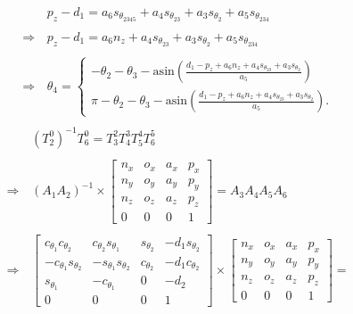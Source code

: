 \documentclass[11pt,a4paper, titlepage]{article}
\begin{document}
\begin{appendices}
\begin{equation}
\end{equation}
\begin{equation}
\begin{split}
&p_z - d_1 = a_6s_{\theta_{2345}} + a_4s_{\theta_{23}} + a_3s_{\theta_2} + a_5s_{\theta_{234}} \\\\
\Rightarrow\,
&p_z - d_1 = a_6n_z + a_4s_{\theta_{23}} + a_3s_{\theta_2} + a_5s_{\theta_{234}} \\\\
\Rightarrow\,
&\theta_4 = \begin{cases}
    -\theta_2 - \theta_3 - \mathrm{asin}\left(\frac{d_1 - p_z + a_6n_z + a_4s_{\theta_{23}} + a_3s_{\theta_2}}{a_5}\right) \\
    \pi -\theta_2 - \theta_3 - \mathrm{asin}\left(\frac{d_1 - p_z + a_6n_z + a_4s_{\theta_{23}} + a_3s_{\theta_2}}{a_5}\right).
  \end{cases} \\
 \end{split}
\end{equation}
\newpage
\begin{equation*}
\begin{split}
&(T_{2}^{0})^{-1}T_{6}^{0} =
T_{3}^{2}T_{4}^{3}T_{5}^{4}T_{6}^{5} \\\\
\Rightarrow \, &(A_{1}A_{2})^{-1} \times
\begin{bmatrix}
n_x & o_x & a_x & p_x \\
n_y & o_y & a_y & p_y \\
n_z & o_z & a_z & p_z \\
0 & 0 & 0 & 1	
\end{bmatrix} = A_3 A_4 A_5 A_6 \\\\
\Rightarrow\, &\begin{bmatrix}
c_{\theta_1}c_{\theta_2} & c_{\theta_2}s_{\theta_1} & s_{\theta_2} & -d_1s_{\theta_2} \\
-c_{\theta_1}s_{\theta_2} & -s_{\theta_1}s_{\theta_2} & c_{\theta_2} & -d_1c_{\theta_2} \\
s_{\theta_1} & -c_{\theta_1} & 0 & -d_2 \\
0 & 0 & 0 & 1	
\end{bmatrix} \times 
\begin{bmatrix}
n_x & o_x & a_x & p_x \\
n_y & o_y & a_y & p_y \\
n_z & o_z & a_z & p_z \\
0 & 0 & 0 & 1	
\end{bmatrix} = 

\end{split}
\end{equation*}
\end{appendices}
\end{document}
